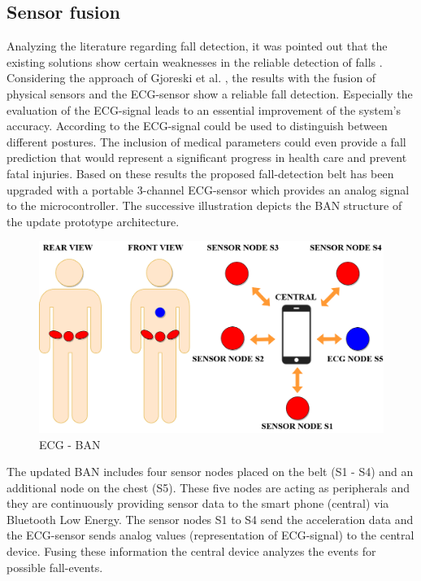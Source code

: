 \documentclass[review]{elsarticle}
\begin{document}
\subsection{Sensor fusion}
\label{subsec:sensorfusion}	
Analyzing the literature regarding fall detection, it was pointed out that the existing solutions show certain weaknesses in the reliable detection of falls \cite{Igual2013, Li2009, Luder2009, Pannurat2014, jamsa2014fall}. Considering the approach of Gjoreski et al. \cite{Gjoreski2014}, the results with the fusion of physical sensors and the ECG-sensor show a reliable fall detection. Especially the evaluation of the ECG-signal leads to an essential improvement of the system's accuracy.  According to \cite{Gjoreski2014} the ECG-signal could be used to distinguish between different postures. The inclusion of medical parameters could even provide a fall prediction that would represent a significant progress in health care and prevent fatal injuries. Based on these results the proposed fall-detection belt  has been upgraded with a portable 3-channel ECG-sensor which provides an analog signal to the microcontroller. The successive illustration depicts the BAN structure of the update prototype architecture.
\begin{figure}[!ht]
	\centering
	\includegraphics[scale=0.29]{Images/ECG-BAN.png}
	\caption[ECG - BAN]{ECG - BAN}
	\label{fig:ECGBAN}
\end{figure}
The updated BAN includes four sensor nodes placed on the belt (S1 - S4) and an additional node on the chest (S5). These five nodes are acting as peripherals and they are continuously providing sensor data to the smart phone (central) via Bluetooth Low Energy. The sensor nodes S1 to S4 send the acceleration data and the ECG-sensor sends analog values (representation of ECG-signal) to the central device. Fusing these information the central device analyzes the events for possible fall-events.
\end{document}
